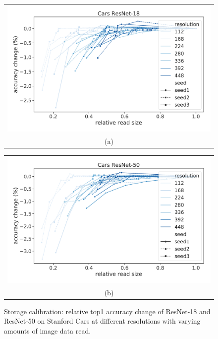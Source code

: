 \begin{figure}
    \centering
    \begin{tabular}{@{}c@{}}
    \includegraphics[width=\textwidth]{e2e_figures/calibration_carsresnet18.pdf}\\
    \small (a)
    \end{tabular}
    \begin{tabular}{@{}c@{}}
    \includegraphics[width=\textwidth]{e2e_figures/calibration_carsresnet50.pdf}\\
    \small (b)
    \end{tabular}
    \caption{Storage calibration: relative top1 accuracy change of ResNet-18 and ResNet-50 on Stanford Cars at different resolutions with varying amounts of image data read.}
    \label{fig:calibration_cars_ssim}
\end{figure}


